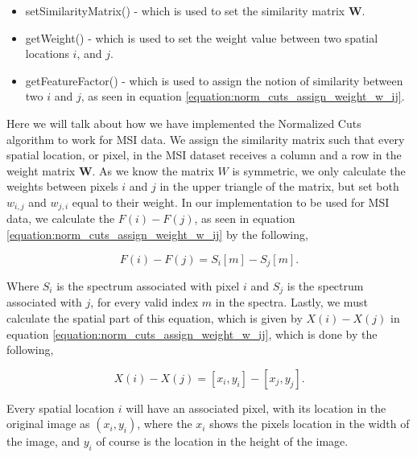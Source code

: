 \documentclass[11pt,openany]{book}
\begin{document}
\begin{itemize}
    \item setSimilarityMatrix() - which is used to set the similarity matrix $\mathbf{W}$.
    \item getWeight() - which is used to set the weight value between two spatial locations $i$, and $j$.
    \item getFeatureFactor() - which is used to assign the notion of similarity between two $i$ and $j$, as seen in equation \ref{equation:norm_cuts_assign_weight_w_ij}.
\end{itemize}

Here we will talk about how we have implemented the Normalized Cuts algorithm to work for MSI data. We assign the similarity matrix such that every spatial location, or pixel, in the MSI dataset receives a column and a row in the weight matrix $\mathbf{W}$. As we know the matrix $W$ is symmetric, we only calculate the weights between pixels $i$ and $j$ in the upper triangle of the matrix, but set both $w_{i,j}$ and $w_{j,i}$ equal to their weight. In our implementation to be used for MSI data, we calculate the $F(i) - F(j)$, as seen in equation \ref{equation:norm_cuts_assign_weight_w_ij} by the following,

\begin{equation}
    F(i) - F(j) = S_i [m] - S_j[m].
\end{equation}

Where $S_i$ is the spectrum associated with pixel $i$ and $S_j$ is the spectrum associated with $j$, for every valid index $m$ in the spectra. Lastly, we must calculate the spatial part of this equation, which is given by $X(i) - X(j)$ in equation \ref{equation:norm_cuts_assign_weight_w_ij}, which is done by the following,

\begin{equation}
    X(i) - X(j) = [x_i, y_i] - [x_j, y_j].
\end{equation}

Every spatial location $i$ will have an associated pixel, with its location in the original image as $(x_i, y_i)$, where the $x_i$ shows the pixels location in the width of the image, and $y_i$ of course is the location in the height of the image. 
\end{document}
